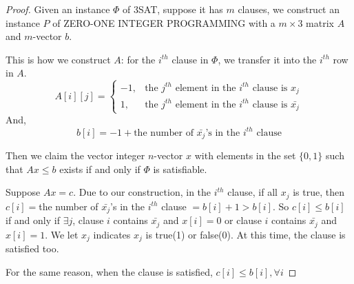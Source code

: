 \documentclass[12pt,a4paper]{article}
\theoremstyle{definition}
\begin{document}
\begin{enumerate}
\begin{proof}
	Given an instance $\Phi$ of 3SAT, suppose it has $m$ clauses, we construct an instance $P$ of ZERO-ONE INTEGER PROGRAMMING with a $m\times3$ matrix $A$ and $m$-vector $b$.
	
	This is how we construct $A$: for the $i^{th}$ clause in $\Phi$, we transfer it into the $i^{th}$ row in $A$.
	$$
	A[i][j] = 
	\begin{cases}
		-1, &\text{the $j^{th}$ element in the $i^{th}$ clause is $x_j$}\\
		1,  &\text{the $j^{th}$ element in the $i^{th}$ clause is $\bar{x_j}$}
	\end{cases}
	$$
	And,
	$$
	b[i] = -1 + \text{the number of $\bar{x_j}$'s in the $i^{th}$ clause}
	$$
	
	Then we claim the vector integer $n$-vector $x$ with elements in the set $\{0, 1\}$ such that $Ax \leq b$ exists if and only if $\Phi$ is satisfiable.
	
	Suppose $Ax = c$. Due to our construction, in the $i^{th}$ clause, if all $x_j$ is true, then $c[i]=$the number of $\bar{x_j}$'s in the $i^{th}$ clause $=b[i]+1 > b[i]$. So $c[i]\leq b[i]$ if and only if $\exists j$, clause $i$ contains $\bar{x_j}$ and $x[i]=0$ or clause $i$ contains $\bar{x_j}$ and $x[i]=1$. We let $x_j$ indicates $x_j$ is true(1) or false(0). At this time, the clause is satisfied too. 
	
	For the same reason, when the clause is satisfied, $c[i]\leq b[i], \forall i$
	
\end{proof}

\end{enumerate}

\end{document}
